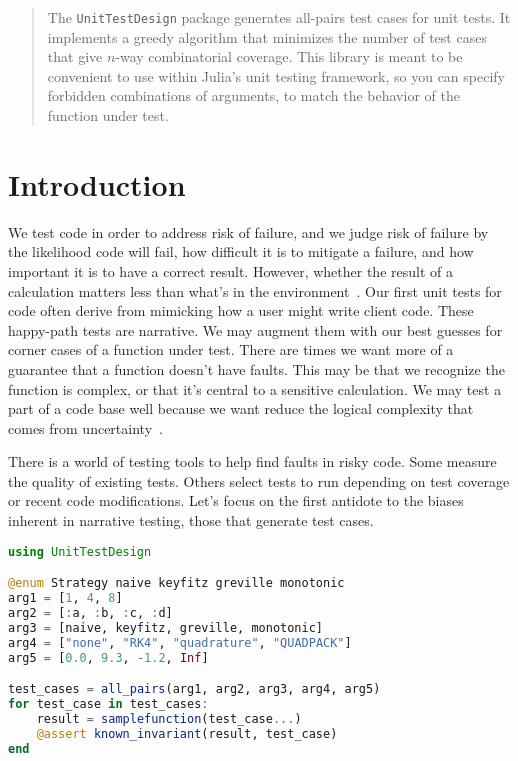 \documentclass{juliacon}
\newcommand{\utd}{\texttt{UnitTestDesign}\xspace}
\begin{document}


\maketitle

\begin{abstract}

The \utd package generates all-pairs test cases for unit tests. It implements a greedy algorithm that minimizes the number of test cases that give $n$-way combinatorial coverage. This library is meant to be convenient to use within Julia's unit testing framework, so you can specify forbidden combinations of arguments, to match the behavior of the function under test.

\end{abstract}

\section{Introduction}

We test code in order to address risk of failure, and we judge risk of failure by the likelihood code will fail, how difficult it is to mitigate a failure, and how important it is to have a correct result. However, whether the result of a calculation matters less than what's in the environment~\cite{Wiklund2017-ms}.
\vskip 6pt
Our first unit tests for code often derive from mimicking how a user might write client code. These happy-path tests are narrative. We may augment them with our best guesses for corner cases of a function under test. There are times we want more of a guarantee that a function doesn't have faults. This may be that we recognize the function is complex, or that it's central to a sensitive calculation. We may test a part of a code base well because we want reduce the logical complexity that comes from uncertainty~\cite{Sha2001-ie}.

\vskip 6pt
There is a world of testing tools to help find faults in risky code. Some measure the quality of existing tests. Others select tests to run depending on test coverage or recent code modifications. Let's focus on the first antidote to the biases inherent in narrative testing, those that generate test cases.

\vskip 6pt
\begin{lstlisting}[language=Julia]
using UnitTestDesign

@enum Strategy naive keyfitz greville monotonic
arg1 = [1, 4, 8]
arg2 = [:a, :b, :c, :d]
arg3 = [naive, keyfitz, greville, monotonic]
arg4 = ["none", "RK4", "quadrature", "QUADPACK"]
arg5 = [0.0, 9.3, -1.2, Inf]

test_cases = all_pairs(arg1, arg2, arg3, arg4, arg5)
for test_case in test_cases:
    result = samplefunction(test_case...)
    @assert known_invariant(result, test_case)
end
\end{lstlisting}
\end{document}

